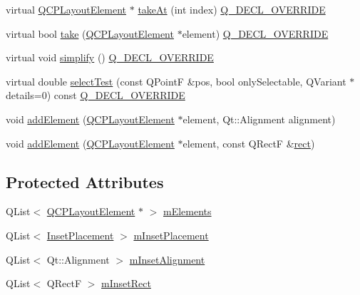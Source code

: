 \begin{DoxyCompactItemize}
\item 
virtual \mbox{\hyperlink{class_q_c_p_layout_element}{Q\+C\+P\+Layout\+Element}} $\ast$ \mbox{\hyperlink{class_q_c_p_layout_inset_abf2e8233f5b7051220907e62ded490a2}{take\+At}} (int index) \mbox{\hyperlink{qcustomplot_8h_a42cc5eaeb25b85f8b52d2a4b94c56f55}{Q\+\_\+\+D\+E\+C\+L\+\_\+\+O\+V\+E\+R\+R\+I\+DE}}
\item 
virtual bool \mbox{\hyperlink{class_q_c_p_layout_inset_af7f13cc369f8190b5e7e17d5f39dfe1c}{take}} (\mbox{\hyperlink{class_q_c_p_layout_element}{Q\+C\+P\+Layout\+Element}} $\ast$element) \mbox{\hyperlink{qcustomplot_8h_a42cc5eaeb25b85f8b52d2a4b94c56f55}{Q\+\_\+\+D\+E\+C\+L\+\_\+\+O\+V\+E\+R\+R\+I\+DE}}
\item 
virtual void \mbox{\hyperlink{class_q_c_p_layout_inset_a18b7d508f0baa60cc5dcb1343cf7f32a}{simplify}} () \mbox{\hyperlink{qcustomplot_8h_a42cc5eaeb25b85f8b52d2a4b94c56f55}{Q\+\_\+\+D\+E\+C\+L\+\_\+\+O\+V\+E\+R\+R\+I\+DE}}
\item 
virtual double \mbox{\hyperlink{class_q_c_p_layout_inset_a2eeef7ea1b8340e7c7c2e2fc229df5ea}{select\+Test}} (const Q\+PointF \&pos, bool only\+Selectable, Q\+Variant $\ast$details=0) const \mbox{\hyperlink{qcustomplot_8h_a42cc5eaeb25b85f8b52d2a4b94c56f55}{Q\+\_\+\+D\+E\+C\+L\+\_\+\+O\+V\+E\+R\+R\+I\+DE}}
\item 
void \mbox{\hyperlink{class_q_c_p_layout_inset_ad61529eb576af7f04dff94abb10c745a}{add\+Element}} (\mbox{\hyperlink{class_q_c_p_layout_element}{Q\+C\+P\+Layout\+Element}} $\ast$element, Qt\+::\+Alignment alignment)
\item 
void \mbox{\hyperlink{class_q_c_p_layout_inset_a8ff61fbee4a1f0ff45c398009d9f1e56}{add\+Element}} (\mbox{\hyperlink{class_q_c_p_layout_element}{Q\+C\+P\+Layout\+Element}} $\ast$element, const Q\+RectF \&\mbox{\hyperlink{class_q_c_p_layout_element_a208effccfe2cca4a0eaf9393e60f2dd4}{rect}})
\end{DoxyCompactItemize}
\subsection*{Protected Attributes}
\begin{DoxyCompactItemize}
\item 
Q\+List$<$ \mbox{\hyperlink{class_q_c_p_layout_element}{Q\+C\+P\+Layout\+Element}} $\ast$ $>$ \mbox{\hyperlink{class_q_c_p_layout_inset_a8fff7eae9a1be9a5c1e544fb379f682f}{m\+Elements}}
\item 
Q\+List$<$ \mbox{\hyperlink{class_q_c_p_layout_inset_a8b9e17d9a2768293d2a7d72f5e298192}{Inset\+Placement}} $>$ \mbox{\hyperlink{class_q_c_p_layout_inset_a57a0a4e445cc78eada29765ecf092abe}{m\+Inset\+Placement}}
\item 
Q\+List$<$ Qt\+::\+Alignment $>$ \mbox{\hyperlink{class_q_c_p_layout_inset_a55e9b84c310136ff985a6544184ab64a}{m\+Inset\+Alignment}}
\item 
Q\+List$<$ Q\+RectF $>$ \mbox{\hyperlink{class_q_c_p_layout_inset_aaa8f6b5029458f3d97a65239524a2b33}{m\+Inset\+Rect}}
\end{DoxyCompactItemize}
